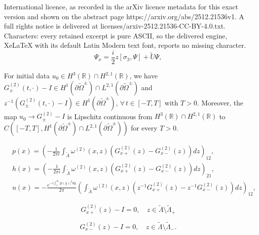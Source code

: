 \documentclass[10pt,a4paper]{amsart}
\begin{document}
International licence, as recorded in the arXiv licence metadata for this exact version and shown on the abstract page https://arxiv.org/abs/2512.21536v1. A full rights notice is delivered at licenses/arxiv-2512.21536-CC-BY-4.0.txt. Characters: every retained excerpt is pure ASCII, so the delivered engine, XeLaTeX with its default Latin Modern text font, reports no missing character.
\begin{equation}\label{Ps}
\Psi_{x}=\frac{i}{2}z\left[\sigma_{3},\Psi\right]+\widetilde{U}\Psi,
\end{equation}

\begin{proposition}\label{timep}
For initial data $u_{0}\in  H^{3}(\mathbb{R})\cap H^{2,1}(\mathbb{R})$, we have $G^{(2)}_{\pm}(t,\cdot)-I \in H^{1}(\partial\widetilde{\Omega}^{\pm})\cap L^{2,1}(\partial\widetilde{\Omega}^{\pm})$ and $z^{-1}(G^{(2)}_{\pm}(t,\cdot)-I )\in H^{1}(\partial\widetilde{\Omega}^{\pm})$,  $\forall\, t\in [-T,T]$ with $T>0$. Moreover, the map $u_{0}\rightarrow G^{(2)}_{\pm}-I$ is Lipschitz continuous from  $H^{3}(\mathbb{R})\cap H^{2,1}(\mathbb{R})$ to $C([-T,T], H^{1}(\partial\widetilde{\Omega}^{\pm})\cap L^{2,1}(\partial\widetilde{\Omega}^{\pm}))$ for every $T>0$.
\end{proposition}

\begin{align}
&p(x)= \left(-\frac{1}{2\pi i} \int_{\widetilde{\Lambda}}\omega^{(2)}(x,z)\left(G^{(2)}_{x+}(z)-G^{(2)}_{x-}(z)\right)dz\right)_{12},\label{rrp}\\
&h(x)= \left(-\frac{1}{2\pi i} \int_{\widetilde{\Lambda}}\omega^{(2)}(x,z)\left(G^{(2)}_{x+}(z)-G^{(2)}_{x-}(z)\right)dz\right)_{21},\label{rrh}\\
&u(x)= -\frac{e^{-i\int_{x}^{\infty}|p(y)|^{2}dy}}{2\pi} \left(\int_{\widetilde{\Lambda}}\omega^{(2)}(x,z)\left(z^{-1}G^{(2)}_{x+}(z)-z^{-1}G^{(2)}_{x-}(z)\right)dz\right)_{12},\label{rru}
\end{align}

\begin{equation}\label{po1}
G^{(2)}_{x+}(z)-I=0,\quad z\in \widetilde{\Lambda}\setminus\widetilde{\Lambda}_{+}
\end{equation}

\begin{equation}\label{po2}
G^{(2)}_{x-}(z)-I=0,\quad z\in \widetilde{\Lambda}\setminus\widetilde{\Lambda}_{-}.
\end{equation}
\end{document}
